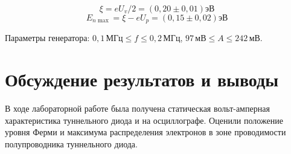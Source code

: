 \documentclass[a4paper,12pt]{article} %
\begin{document}
	\[\boxed{\xi = eU_v/2 = (0,20 \pm 0,01) \text{эВ} }\]
	\[\boxed{E_{n \max} = \xi - eU_p = (0,15 \pm 0,02) \text{эВ}}\]
	
	Параметры генератора: $0,1\,\text{МГц}\le f \le 0,2\,\text{МГц} $, $97\, \text{мВ} \le A \le 242\, \text{мВ}$.
	
	\section{Обсуждение результатов и выводы}
	В ходе лабораторной работе была получена статическая вольт-амперная характеристика туннельного диода и на осциллографе. Оценили положение уровня Ферми и максимума распределения электронов в зоне проводимости полупроводника туннельного диода.
	
\end{document}
